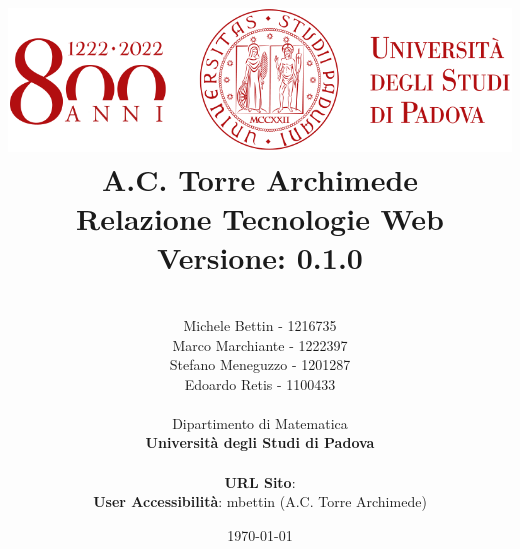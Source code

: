 \pagestyle{fancy}
    \fancyhf{}
    
    
\title{
    \includegraphics[scale=0.5]{images/logo.png} \\
    \vspace*{1in}
    {
        \Huge \textbf{A.C. Torre Archimede}}\\
        \vspace*{0.25in}
        \textbf{Relazione Tecnologie Web}\\
        \vspace{0.2in}
        \textbf{Versione: 0.1.0}\\
        \vspace{0.1in}
    }

\author{
    \begin{tabular}[t]{c@{}c}
        \hline
        \\
        Michele Bettin - 1216735\\
        Marco Marchiante - 1222397\\
        Stefano Meneguzzo - 1201287\\
        Edoardo Retis - 1100433\\
    \end{tabular}
    \vspace*{0.5in} \\
    Dipartimento di Matematica \\
    \textbf{Università degli Studi di Padova} \\
    \vspace*{0.5in} \\
    \textbf{URL Sito}:  \\
    \textbf{User Accessibilità}: mbettin (A.C. Torre Archimede)\\
} 
\date{\today}


\setlength{\oddsidemargin}{0in} \setlength{\evensidemargin}{0in}
\setlength{\topmargin}{0in}     \setlength{\headsep}{.25in}
\setlength{\textwidth}{6.5in}   \setlength{\textheight}{8.5in}
\setlength{\parindent}{1cm}